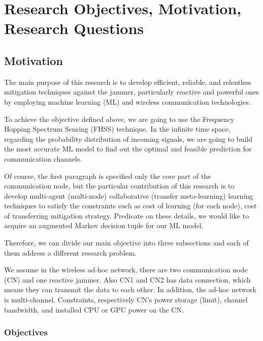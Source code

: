 \documentclass[letterpaper%
, twoside%
, 12pt%
,thesepararticles%
, english%
,creativecommons,hyperref, withAlgo2e%
]{thETS}
\begin{document}


\chapter{Research Objectives, Motivation, Research Questions}

\section{Motivation}

The main purpose of this research is to develop efficient, reliable, and relentless mitigation techniques against the jammer, particularly reactive and powerful ones by employing machine learning (ML) and wireless communication technologies. 

To achieve the objective defined above, we are going to use the Frequency Hopping Spectrum  Sensing (FHSS) technique. In the infinite time space, regarding the probability distribution of incoming signals, we are going to build the most accurate ML model to find out  the optimal and feasible prediction for communication channels.

Of course, the first paragraph is specified only the core part of the communication node, but the particular contribution of this research is to develop multi-agent (multi-node) collaborative (transfer meta-learning) learning techniques to satisfy the constraints such as cost of learning (for each node), cost of transferring mitigation strategy. Predicate on these details, we would like to acquire an augmented Markov decision tuple for our ML model.

Therefore, we can divide our main objective into three subsections and each of them address a different research problem.

We assume in the wireless ad-hoc network, there are two communication node (CN) and one reactive jammer. Also CN1 and CN2 has data connection, which means they can transmit the data to each other. In addition, the ad-hoc network is multi-channel. Constraints, respectively CN's power storage (limit), channel bandwidth, and installed CPU or GPU power on the CN. 

\subsection{Objectives}
\end{document}
